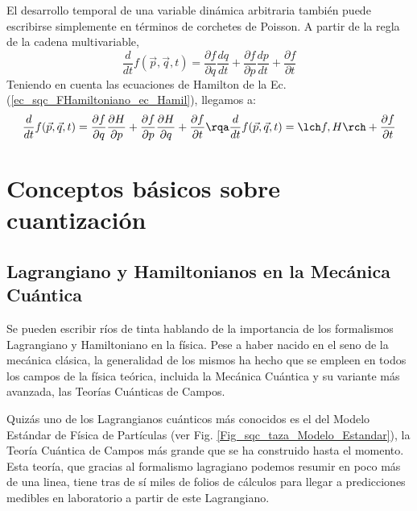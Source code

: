         El desarrollo temporal de una variable dinámica arbitraria también puede escribirse simplemente en términos de corchetes de Poisson.  A partir de la regla de la cadena multivariable,
        \begin{equation}
            \frac{d}{dt} f(\vec{p}, \vec{q},t) = 
                \frac{\partial f}{\partial q} \frac{d q}{d t} +
                \frac{\partial f}{\partial p} \frac{d p}{d t} +
                \frac{\partial f}{\partial t}
        \end{equation}
        Teniendo en cuenta las ecuaciones de Hamilton de la Ec. (\ref{ec_sqc_FHamiltoniano_ec_Hamil}), llegamos a:
        \begin{equation} \label{ec_sqc_poisson_df}
            \frac{d}{dt} f(\vec{p}, \vec{q},t)  = 
                \frac{\partial f}{\partial q} \frac{\partial H}{\partial p} +
                \frac{\partial f}{\partial p} \frac{\partial H}{\partial q} +
                \frac{\partial f}{\partial t} 
            \rqa 
            \frac{d}{dt} f(\vec{p}, \vec{q},t)  = \lch f, H \rch + \frac{\partial f}{\partial t}
        \end{equation}








\newpage
\section{Conceptos básicos sobre cuantización} \label{sec_scq_conceptos_cuantizacion}

    \subsection{Lagrangiano y Hamiltonianos en la Mecánica Cuántica}
    
    Se pueden escribir ríos de tinta hablando de la importancia de los formalismos Lagrangiano y Hamiltoniano en la física. Pese a haber nacido en el seno de la mecánica clásica, la generalidad de los mismos ha hecho que se empleen en todos los campos de la física teórica, incluida la Mecánica Cuántica y su variante más avanzada, las Teorías Cuánticas de Campos. 

    Quizás uno de los Lagrangianos cuánticos más conocidos es el del Modelo Estándar de Física de Partículas (ver Fig. \ref{Fig_sqc_taza_Modelo_Estandar}), la Teoría Cuántica de Campos más grande que se ha construido hasta el momento. Esta teoría, que gracias al formalismo lagragiano podemos resumir en poco más de una linea, tiene tras de sí miles de folios de cálculos para llegar a predicciones medibles en laboratorio a partir de este Lagrangiano. 


